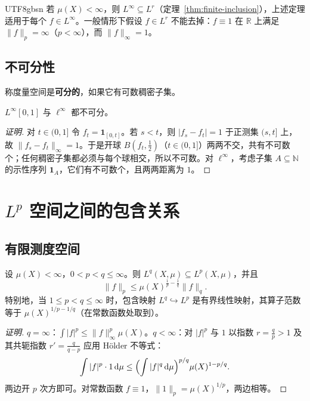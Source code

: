 \documentclass[11pt]{article}
\newcommand{\R}{\mathbb{R}}
\newcommand{\N}{\mathbb{N}}
\newcommand{\norm}[1]{\lVert #1\rVert}
\newcommand{\dmu}{\,\mathrm{d}\mu}
\newcommand{\ind}{\mathbf{1}}
\begin{document}
\begin{CJK*}{UTF8}{gbsn}
若 $\mu(X)<\infty$，则 $L^{\infty}\subseteq L^{r}$（定理~\ref{thm:finite-inclusion}），上述定理适用于每个 $f\in L^{\infty}$。一般情形下假设 $f\in L^{r}$ 不能去掉：$f\equiv1$ 在 $\R$ 上满足 $\norm{f}_{p}=\infty$（$p<\infty$），而 $\norm{f}_{\infty}=1$。

\subsection{不可分性}

称度量空间是\textbf{可分的}，如果它有可数稠密子集。

\begin{proposition}\label{prop:Linfty-nonsep}
$L^{\infty}[0,1]$ 与 $\ell^{\infty}$ 都不可分。
\end{proposition}

\begin{proof}[证明]
对 $t\in(0,1]$ 令 $f_{t}=\ind_{[0,t]}$。若 $s<t$，则 $|f_{s}-f_{t}|=1$ 于正测集 $(s,t]$ 上，故 $\norm{f_{s}-f_{t}}_{\infty}=1$。于是开球 $B(f_{t},\frac12)$（$t\in(0,1]$）两两不交，共有不可数个；任何稠密子集都必须与每个球相交，所以不可数。对 $\ell^{\infty}$，考虑子集 $A\subseteq\N$ 的示性序列 $\ind_{A}$，它们有不可数个，且两两距离为 $1$。
\end{proof}

\section{$L^{p}$ 空间之间的包含关系}

\subsection{有限测度空间}

\begin{theorem}\label{thm:finite-inclusion}
设 $\mu(X)<\infty$，$0<p<q\le\infty$。则 $L^{q}(X,\mu)\subseteq L^{p}(X,\mu)$，并且
\[
\norm{f}_{p}\le\mu(X)^{\frac1p-\frac1q}\norm{f}_{q}.
\]
特别地，当 $1\le p<q\le\infty$ 时，包含映射 $L^{q}\hookrightarrow L^{p}$ 是有界线性映射，其算子范数等于 $\mu(X)^{1/p-1/q}$（在常数函数处取到）。
\end{theorem}

\begin{proof}[证明]
$q=\infty$：$\int|f|^{p}\le\norm{f}_{\infty}^{p}\mu(X)$。$q<\infty$：对 $|f|^{p}$ 与 $1$ 以指数 $r=\frac qp>1$ 及其共轭指数 $r'=\frac{q}{q-p}$ 应用 Hölder 不等式：
\[
\int|f|^{p}\cdot1\dmu\le\Bigl(\int|f|^{q}\dmu\Bigr)^{p/q}\mu(X)^{1-p/q}.
\]
两边开 $p$ 次方即可。对常数函数 $f\equiv1$，$\norm{1}_{p}=\mu(X)^{1/p}$，两边相等。
\end{proof}


\end{CJK*}
\end{document}
